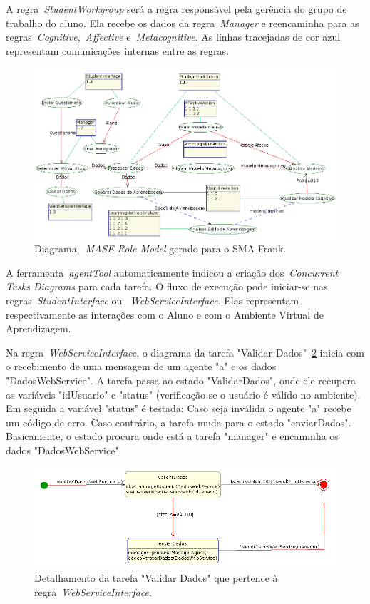 A regra~\emph{StudentWorkgroup} será a regra responsável pela gerência do grupo de trabalho do aluno. Ela recebe os dados da regra~\emph{Manager} e reencaminha para as regras~\emph{Cognitive},~\emph{Affective} e~\emph{Metacognitive}. As linhas tracejadas de cor azul representam comunicações internas entre as regras.

\begin{figure}
	\centering
	\includegraphics[scale=0.48]{images/mase-role-model.png}
	\caption{Diagrama ~\emph{MASE Role Model} gerado para o SMA Frank.}
	\label{fig:frank-role-model}
\end{figure}

A ferramenta~\emph{agentTool} automaticamente indicou a criação dos~\emph{Concurrent Tasks Diagrams} para cada tarefa. O fluxo de execução pode iniciar-se nas regras~\emph{StudentInterface} ou ~\emph{WebServiceInterface}. Elas representam respectivamente as interações com o Aluno e com o Ambiente Virtual de Aprendizagem.

Na regra~\emph{WebServiceInterface}, o diagrama da tarefa "Validar Dados"~\ref{fig:validar-dados} inicia com o recebimento de uma mensagem de um agente "a" e os dados "DadosWebService". A tarefa passa ao estado "ValidarDados", onde ele recupera as variáveis "idUsuario" e "status" (verificação se o usuário é válido no ambiente). Em seguida a variável "status" é testada: Caso seja inválida o agente "a" recebe um código de erro. Caso contrário, a tarefa muda para o estado "enviarDados". Basicamente, o estado procura onde está a tarefa "manager" e encaminha os dados "DadosWebService"
 
\begin{figure}
	\centering
	\includegraphics[scale=0.48]{images/td-validar-dados.png}
	\caption{Detalhamento da tarefa "Validar Dados" que pertence à regra~\emph{WebServiceInterface}.}
	\label{fig:validar-dados}
\end{figure}

